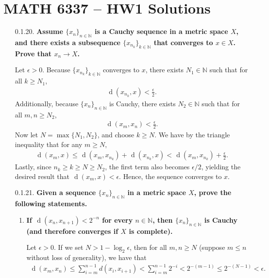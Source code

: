 \documentclass[a4paper,12pt]{article}
\newcommand*\dist{\mathop{\!\mathrm{d}}}
\begin{document}
\section*{MATH 6337 -- HW1 Solutions}
\begin{enumerate}
    \item[0.1.20.]
        \boldmath\textbf{Assume $\{x_n\}_{n \in \mathbb{N}}$ is a Cauchy sequence in a metric space $X$, and there exists a subsequence $\{x_{n_k}\}_{k \in \mathbb{N}}$ that converges to $x \in X$. Prove that $x_n \to X$.
        }\unboldmath \par
        Let $\epsilon > 0$. Because $\{x_{n_k}\}_{k \in \mathbb{N}}$ converges to $x$, there exists $N_1 \in \mathbb{N}$ such that for all $k \geq N_1$,
        \begin{align*}
            \dist(x_{n_k}, x) < \frac{\epsilon}{2}.
        \end{align*}
        Additionally, because $\{x_n\}_{n \in \mathbb{N}}$ is Cauchy, there exists $N_2 \in \mathbb{N}$ such that for all $m, n \geq N_2$,
        \begin{align*}
            \dist(x_m, x_n) < \frac{\epsilon}{2}.
        \end{align*}
        Now let $N = \max\{ N_1, N_2 \}$, and choose $k \geq N$. We have by the triangle inequality that for any $m \geq N$,
        \begin{align*}
            \dist(x_m, x) \leq \dist(x_m, x_{n_k}) + \dist(x_{n_k}, x) < \dist(x_m, x_{n_k}) + \frac{\epsilon}{2}.
        \end{align*}
        Lastly, since $n_k \geq k \geq N \geq N_2$, the first term also becomes $\epsilon/2$, yielding the desired result that $\dist(x_m, x) < \epsilon$. Hence, the sequence converges to $x$.

    \item[0.1.21.]
        \boldmath\textbf{Given a sequence $\{x_n\}_{n \in \mathbb{N}}$ in a metric space $X$, prove the following statements.
        }\unboldmath \par
        \begin{enumerate}[label=(\alph*)]
            \item
                \boldmath\textbf{If $\dist(x_n, x_{n + 1}) < 2^{-n}$ for every $n \in \mathbb{N}$, then $\{x_n\}_{n \in \mathbb{N}}$ is Cauchy (and therefore converges if $X$ is complete).
                }\unboldmath \par
                Let $\epsilon > 0$. If we set $N > 1 - \log_2 \epsilon$, then for all $m, n \geq N$ (suppose $m \leq n$ without loss of generality), we have that
                \begin{align*}
                    \dist(x_m, x_n) \leq \sum_{i = m}^{n - 1} d(x_i, x_{i + 1}) < \sum_{i = m}^{n - 1} 2^{-i} < 2^{-(m - 1)} \leq 2^{-(N - 1)} < \epsilon.
                \end{align*}


\end{enumerate}
\end{enumerate}
\end{document}
